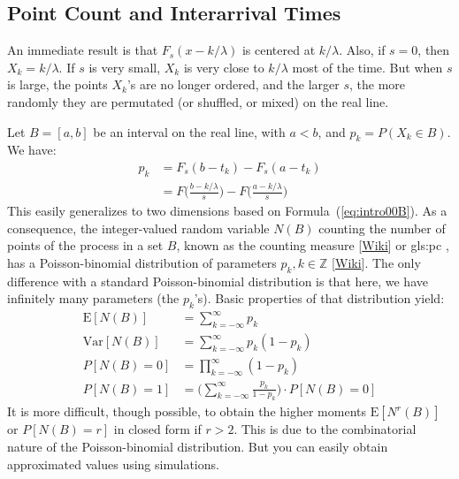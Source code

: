 \documentclass[10pt]{article}
\begin{document}
\subsection{Point Count and Interarrival Times}\label{intro2}

An immediate result is that $F_s(x-k/\lambda)$ is centered at $k/\lambda$. Also, if $s=0$, then $X_k=k/\lambda$. If $s$ is very small, $X_k$ is very close to $k/\lambda$ most of the time. But when $s$ is large, the points $X_k$'s are no longer ordered, and the larger $s$, the more randomly they are permutated (or shuffled, or mixed) on the real line.

Let $B=[a,b]$ be an interval on the real line, with $a<b$, and $p_k=P(X_k\in B)$. We have:
\begin{align}
p_k   & = F_s(b-t_k) - F_s(a-t_k) \nonumber \\
  & = F\Big(\frac{b-k/\lambda}{s}\Big)-F\Big(\frac{a-k/\lambda}{s}\Big)\label{eq:f0}
\end{align}
This easily generalizes to two dimensions based on Formula~(\ref{eq:intro00B}). As a consequence, the integer-valued random variable $N(B)$ counting the number of points of the process in  a set $B$, known as the \textcolor{index}{counting measure} [\href{https://en.wikipedia.org/wiki/Counting_measure}{Wiki}] or
\gls{gls:pc} %
, has a
\textcolor{index}{Poisson-binomial distribution} of parameters $p_k,k\in\mathbb{Z}$
[\href{https://en.wikipedia.org/wiki/Poisson_binomial_distribution}{Wiki}]. The only difference with a standard Poisson-binomial distribution is that here, we have infinitely many parameters (the $p_k$'s). Basic properties of that distribution yield:
\begin{align}
\mbox{E}[N(B)] & = \sum_{k=-\infty}^\infty p_k \label{eq:f1}\\
\mbox{Var}[N(B)] & = \sum_{k=-\infty}^\infty p_k(1-p_k)\label{eq:f2} \\
P[N(B)=0] & = \prod_{k=-\infty}^\infty (1-p_k) \label{eq:f3} \\
P[N(B)=1] & = \Big(\sum_{k=-\infty}^{\infty}\frac{p_k}{1-p_k}\Big) \cdot P[N(B)=0]\label{eq:f4}
\end{align}
It is more difficult, though possible, to obtain the higher moments $\mbox{E}[N^r(B)]$ or $P[N(B)=r]$ in closed form if $r>2$. This is due to the combinatorial nature of the
Poisson-binomial distribution. But you can easily obtain approximated values using simulations.
\end{document}
